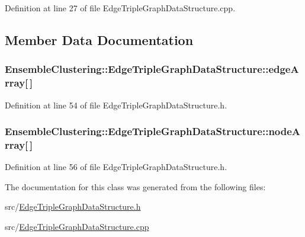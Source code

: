 Definition at line 27 of file Edge\-Triple\-Graph\-Data\-Structure.\-cpp.



\subsection{Member Data Documentation}
\hypertarget{class_ensemble_clustering_1_1_edge_triple_graph_data_structure_a962540d6fb4526ae56bb55435ebbc587}{
\subsubsection[{edge\-Array}]{ Ensemble\-Clustering\-::\-Edge\-Triple\-Graph\-Data\-Structure\-::edge\-Array\mbox{[}$\,$\mbox{]}}}\label{class_ensemble_clustering_1_1_edge_triple_graph_data_structure_a962540d6fb4526ae56bb55435ebbc587}


Definition at line 54 of file Edge\-Triple\-Graph\-Data\-Structure.\-h.

\hypertarget{class_ensemble_clustering_1_1_edge_triple_graph_data_structure_a85cb4ce8c8f92706b3050fbca8c2858d}{
\subsubsection[{node\-Array}]{ Ensemble\-Clustering\-::\-Edge\-Triple\-Graph\-Data\-Structure\-::node\-Array\mbox{[}$\,$\mbox{]}}}\label{class_ensemble_clustering_1_1_edge_triple_graph_data_structure_a85cb4ce8c8f92706b3050fbca8c2858d}


Definition at line 56 of file Edge\-Triple\-Graph\-Data\-Structure.\-h.



The documentation for this class was generated from the following files\-:\begin{DoxyCompactItemize}
\item 
src/\hyperlink{_edge_triple_graph_data_structure_8h}{Edge\-Triple\-Graph\-Data\-Structure.\-h}\item 
src/\hyperlink{_edge_triple_graph_data_structure_8cpp}{Edge\-Triple\-Graph\-Data\-Structure.\-cpp}\end{DoxyCompactItemize}
